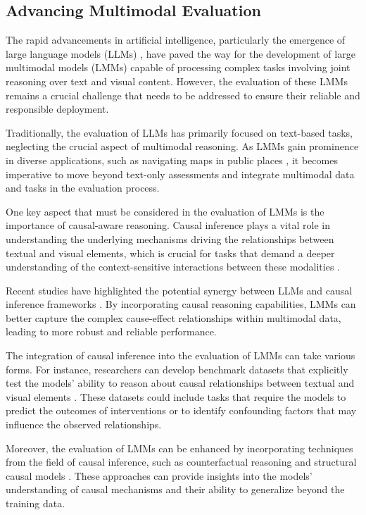 \documentclass[11pt]{article}
\begin{document}
\subsection{Advancing Multimodal Evaluation}

The rapid advancements in artificial intelligence, particularly the emergence of large language models (LLMs) \cite{ref61}, have paved the way for the development of large multimodal models (LMMs) capable of processing complex tasks involving joint reasoning over text and visual content. However, the evaluation of these LMMs remains a crucial challenge that needs to be addressed to ensure their reliable and responsible deployment.

Traditionally, the evaluation of LLMs has primarily focused on text-based tasks, neglecting the crucial aspect of multimodal reasoning. As LMMs gain prominence in diverse applications, such as navigating maps in public places \cite{ref349}, it becomes imperative to move beyond text-only assessments and integrate multimodal data and tasks in the evaluation process.

One key aspect that must be considered in the evaluation of LMMs is the importance of causal-aware reasoning. Causal inference plays a vital role in understanding the underlying mechanisms driving the relationships between textual and visual elements, which is crucial for tasks that demand a deeper understanding of the context-sensitive interactions between these modalities \cite{ref277,ref297}.

Recent studies have highlighted the potential synergy between LLMs and causal inference frameworks \cite{ref333,ref328,ref350}. By incorporating causal reasoning capabilities, LMMs can better capture the complex cause-effect relationships within multimodal data, leading to more robust and reliable performance.

The integration of causal inference into the evaluation of LMMs can take various forms. For instance, researchers can develop benchmark datasets that explicitly test the models' ability to reason about causal relationships between textual and visual elements \cite{ref330,ref351}. These datasets could include tasks that require the models to predict the outcomes of interventions or to identify confounding factors that may influence the observed relationships.

Moreover, the evaluation of LMMs can be enhanced by incorporating techniques from the field of causal inference, such as counterfactual reasoning and structural causal models \cite{ref352,ref327,ref329}. These approaches can provide insights into the models' understanding of causal mechanisms and their ability to generalize beyond the training data.
\end{document}
